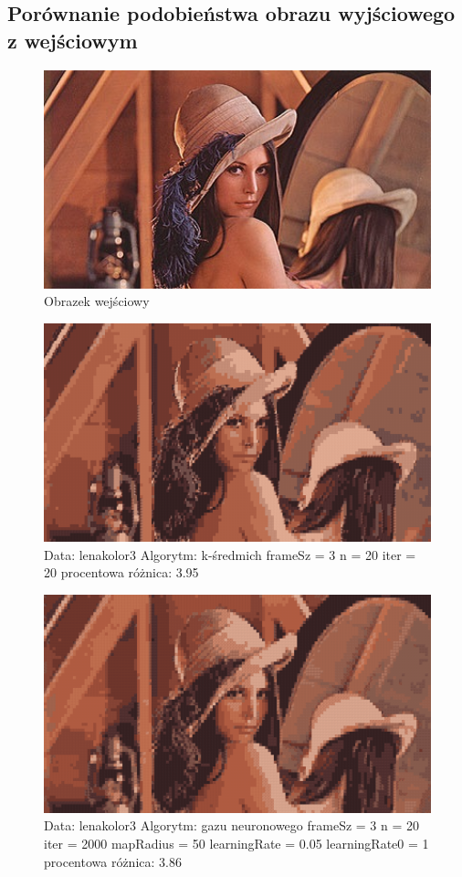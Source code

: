 \documentclass{classrep}
\begin{document}
{{\subsection{Porównanie podobieństwa obrazu wyjściowego z wejściowym}

\begin{figure}[h!]
 \centering
 \includegraphics[width=12cm]{img/lenakolor3.jpg}
 \vspace{-0.3cm}
 \caption{Obrazek wejściowy
}
\end{figure}

\newpage

\begin{figure}[h!]
 \centering
 \includegraphics[width=12cm]{img/km1.png}
 \vspace{-0.3cm}
 \caption{Data: lenakolor3 Algorytm: k-średmich frameSz = 3 n = 20 iter = 20 procentowa różnica: 3.95%
}
\end{figure}

\begin{figure}[h!]
 \centering
 \includegraphics[width=12cm]{img/ng1.png}
 \vspace{-0.3cm}
 \caption{Data: lenakolor3 Algorytm: gazu neuronowego frameSz = 3 n = 20 iter = 2000 mapRadius = 50 learningRate = 0.05 learningRate0  = 1 procentowa różnica: 3.86
}
\end{figure}

}}
\end{document}
